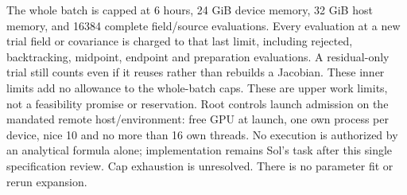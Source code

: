\documentclass[11pt]{article}
\begin{document}
The whole batch is capped at 6 hours, 24 GiB device memory,
32 GiB host memory, and 16384 complete field/source evaluations.
Every evaluation at a new trial field or covariance is charged
to that last limit, including rejected, backtracking, midpoint,
endpoint and preparation evaluations.  A residual-only trial
still counts even if it reuses rather than rebuilds a Jacobian.
These inner limits add no allowance to the whole-batch caps.
These are upper work limits, not a feasibility promise or
reservation.  Root controls launch admission on the mandated
remote host/environment: free GPU at launch, one own process per
device, nice 10 and no more than 16 own threads.  No execution is
authorized by an analytical formula alone; implementation remains
Sol's task after this single specification review.  Cap exhaustion
is unresolved.  There is no parameter fit or rerun expansion.
\end{document}
